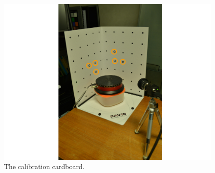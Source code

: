 \documentclass[11pt]{article}
\begin{document}
\begin{enumerate}
 \begin{figure}[h]
 	\begin{center}
 		\includegraphics[width=11 cm]{images/calibCardboard.pdf}
 	\end{center}
 	\caption{The calibration cardboard.}
 	\label{fig:calibCardboard}
 \end{figure}


\end{enumerate}
\end{document}
